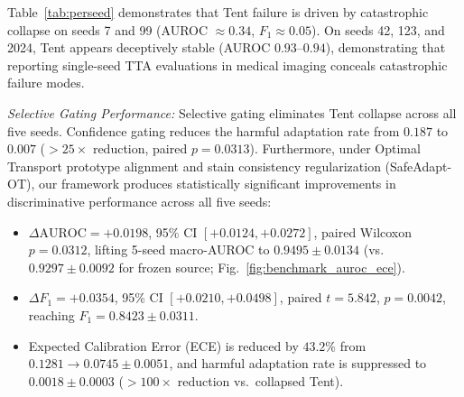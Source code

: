 \documentclass[journal]{IEEEtran}
\begin{document}
\begin{table}[t]
\caption{Per-seed target AUROC on Hospital 2. Collapse cells highlighted in bold.}
\label{tab:perseed}
\centering
\scriptsize
\renewcommand{\arraystretch}{0.92}
\setlength{\tabcolsep}{3.5pt}
\end{table}

Table~\ref{tab:perseed} demonstrates that Tent failure is driven by catastrophic collapse on seeds 7 and 99 (AUROC $\approx 0.34$, $F_1 \approx 0.05$). On seeds 42, 123, and 2024, Tent appears deceptively stable (AUROC $0.93$--$0.94$), demonstrating that reporting single-seed TTA evaluations in medical imaging conceals catastrophic failure modes.

\textit{Selective Gating Performance:} Selective gating eliminates Tent collapse across all five seeds. Confidence gating reduces the harmful adaptation rate from $0.187$ to $0.007$ ($>25\times$ reduction, paired $p=0.0313$). Furthermore, under Optimal Transport prototype alignment and stain consistency regularization (SafeAdapt-OT), our framework produces statistically significant improvements in discriminative performance across all five seeds:
\begin{itemize}
\item $\Delta \mathrm{AUROC} = +0.0198$, 95\% CI $[+0.0124, +0.0272]$, paired Wilcoxon $p=0.0312$, lifting 5-seed macro-AUROC to $0.9495 \pm 0.0134$ (vs.\ $0.9297 \pm 0.0092$ for frozen source; Fig.~\ref{fig:benchmark_auroc_ece}).
\item $\Delta F_1 = +0.0354$, 95\% CI $[+0.0210, +0.0498]$, paired $t=5.842$, $p=0.0042$, reaching $F_1 = 0.8423 \pm 0.0311$.
\item Expected Calibration Error (ECE) is reduced by $43.2\%$ from $0.1281 \to 0.0745 \pm 0.0051$, and harmful adaptation rate is suppressed to $0.0018 \pm 0.0003$ ($>100\times$ reduction vs.\ collapsed Tent).
\end{itemize}
\end{document}
